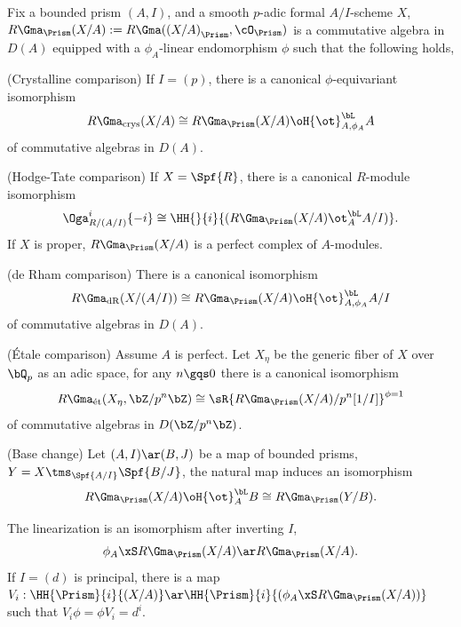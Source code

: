 \documentclass[a4paper, twoside]{article}
\begin{document}
\begin{thm}
	Fix a bounded prism $(A,I)$, and a smooth $p$-adic formal $A/I$-scheme $X$, $R\Gma_{\Prism}(X/A):=R\Gma({(X/A)}_{\Prism},\cO_{\Prism})$ is a commutative algebra in $D(A)$ equipped with a $\phi_{A}$-linear endomorphism $\phi$ such that the following holds,
	\begin{enr}[label=(\arabic*)]
		\item (Crystalline comparison) If $I=(p)$, there is a canonical $\phi$-equivariant isomorphism
		\[
			R\Gma_{\text{crys}}(X/A)\cong R\Gma_{\Prism}(X/A)\oH{\ot}^{\bL}_{A,\phi_{A}}A
		\]
		of commutative algebras in $D(A)$.
		\item (Hodge-Tate comparison) If $X=\Spf{R}$, there is a canonical $R$-module isomorphism
		\[
			\Oga_{R/(A/I)}^{i}\{-i\}\cong\HH{}{i}{(R\Gma_{\Prism}(X/A)\ot_{A}^{\bL}A/I)}.
		\]
		If $X$ is proper, $R\Gma_{\Prism}(X/A)$ is a perfect complex of $A$-modules.
		\item (de Rham comparison) There is a canonical isomorphism
		\[
			R\Gma_{\text{dR}}(X/(A/I))\cong R\Gma_{\Prism}(X/A)\oH{\ot}^{\bL}_{A,\phi_{A}}A/I
		\]
		of commutative algebras in $D(A)$.
		\item ({\'E}tale comparison) Assume $A$ is perfect. Let $X_{\eta}$ be the generic fiber of $X$ over $\bQ_{p}$ as an adic space, for any $n\gqs0$ there is a canonical isomorphism
		\[
			R\Gma_{\text{{\'e}t}}(X_{\eta},\bZ/p^{n}\bZ)\cong\sR{R\Gma_{\Prism}(X/A)/p^{n}[1/I]}^{\phi=1}
		\]
		of commutative algebras in $D(\bZ/p^{n}\bZ)$.
		\item (Base change) Let $(A,I)\ar(B,J)$ be a map of bounded prisms, $Y=X\tms_{\Spf{A/I}}\Spf{B/J}$, the natural map induces an isomorphism
		\[
			R\Gma_{\Prism}(X/A)\oH{\ot}_{A}^{\bL}B\cong R\Gma_{\Prism}(Y/B).
		\]
		\item The linearization is an isomorphism after inverting $I$,
		\[
			\phi_{A}\xS R\Gma_{\Prism}(X/A)\ar R\Gma_{\Prism}(X/A).
		\]
		If $I=(d)$ is principal, there is a map $V_{i}:\HH{\Prism}{i}{(X/A)}\ar\HH{\Prism}{i}{(\phi_{A}\xS R\Gma_{\Prism}(X/A))}$ such that $V_{i}\phi=\phi V_{i}=d^{i}$.
	\end{enr}
\end{thm}




\printref
\end{document}

